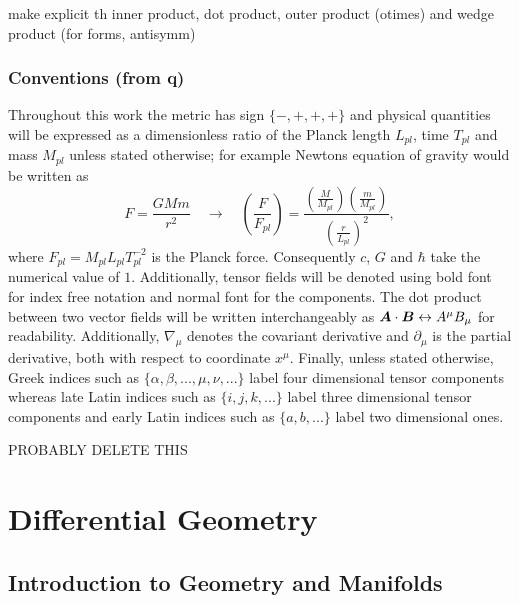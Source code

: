 make explicit th inner product, dot product, outer product (otimes) and wedge product (for forms, antisymm)

\subsubsection*{Conventions (from q)}

Throughout this work the metric has sign $\{-,+,+,+\}$ and physical quantities will be expressed as a dimensionless ratio of the Planck length $L_{pl}$, time $T_{pl}$ and mass $M_{pl}$ unless stated otherwise; for example Newtons equation of gravity would be written as
\begin{equation}
F=\frac{GMm}{r^2} \quad \rightarrow \quad\left(\frac{F}{F_{pl}}\right) = \frac{\left(\frac{M}{M_{pl}}\right)  \left(\frac{m}{M_{pl}}\right)}{\left(\frac{r}{L_{pl}}\right)^2},
\end{equation}
where $F_{pl} = M_{pl}L_{pl}T_{pl}^{-2}$ is the Planck force. Consequently $c$, $G$ and $\hbar$ take the numerical value of $1$. Additionally, tensor fields will be denoted using bold font for index free notation and normal font for the components. The dot product between two vector fields will be written interchangeably as $\boldsymbol{A}\cdot\boldsymbol{B}\leftrightarrow A^\mu B_\mu$ for readability. Additionally, $\nabla_\mu$ denotes the covariant derivative and $\partial_\mu$ is the partial derivative, both with respect to coordinate $x^\mu$. Finally, unless stated otherwise, Greek indices such as $\{\alpha, \beta, ..., \mu, \nu, ... \}$ label four dimensional tensor components whereas late Latin indices such as $\{i,j,k,...\}$ label three dimensional tensor components and early Latin indices such as $\{a,b,...\}$ label two dimensional ones.

PROBABLY DELETE THIS






\section{Differential Geometry}
\subsection{Introduction to Geometry and Manifolds}





